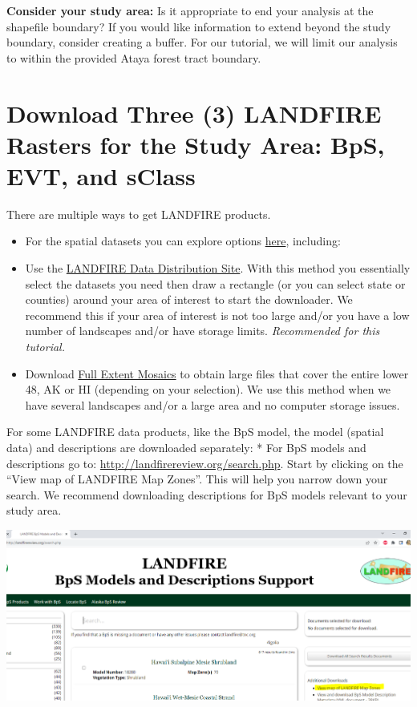 \documentclass[
]{book}
\providecommand{\tightlist}{%
  \setlength{\itemsep}{0pt}\setlength{\parskip}{0pt}}
\begin{document}
\textbf{Consider your study area:} Is it appropriate to end your analysis at the shapefile boundary? If you would like information to extend beyond the study boundary, consider creating a buffer. For our tutorial, we will limit our analysis to within the provided Ataya forest tract boundary.

\hypertarget{download-three-3-landfire-rasters-for-the-study-area-bps-evt-and-sclass}{%
\section{Download Three (3) LANDFIRE Rasters for the Study Area: BpS, EVT, and sClass}\label{download-three-3-landfire-rasters-for-the-study-area-bps-evt-and-sclass}}

There are multiple ways to get LANDFIRE products.

\begin{itemize}
\tightlist
\item
  For the spatial datasets you can explore options \href{https://www.landfire.gov/getdata.php}{here}, including:
\item
  Use the \href{https://www.landfire.gov/viewer/}{LANDFIRE Data Distribution Site}. With this method you essentially select the datasets you need then draw a rectangle (or you can select state or counties) around your area of interest to start the downloader. We recommend this if your area of interest is not too large and/or you have a low number of landscapes and/or have storage limits. \emph{Recommended for this tutorial.}
\item
  Download \href{https://www.landfire.gov/version_comparison.php}{Full Extent Mosaics} to obtain large files that cover the entire lower 48, AK or HI (depending on your selection). We use this method when we have several landscapes and/or a large area and no computer storage issues.
\end{itemize}

For some LANDFIRE data products, like the BpS model, the model (spatial data) and descriptions are downloaded separately:
* For BpS models and descriptions go to: \url{http://landfirereview.org/search.php}. Start by clicking on the ``View map of LANDFIRE Map Zones''. This will help you narrow down your search. We recommend downloading descriptions for BpS models relevant to your study area.

\includegraphics[width=1000px]{04_gis_screenshots/2_view_mapzone}
\end{document}
